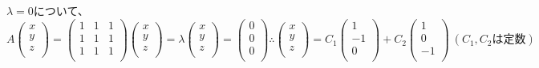 \documentclass[]{jsarticle}
\begin{document}
        $\lambda = 0$について、
            \begin{equation*}
                A
                \begin{pmatrix}
                    x \\
                    y \\
                    z \\
                \end{pmatrix} =
                \begin{pmatrix}
                    1 & 1 & 1 \\
                    1 & 1 & 1 \\
                    1 & 1 & 1 \\
                \end{pmatrix}
                \begin{pmatrix}
                    x \\
                    y \\
                    z \\
                \end{pmatrix} =
                \lambda
                \begin{pmatrix}
                    x \\
                    y \\
                    z \\
                \end{pmatrix} =
                \begin{pmatrix}
                    0 \\
                    0 \\
                    0 \\
                \end{pmatrix}
                \therefore
                \begin{pmatrix}
                    x \\
                    y \\
                    z \\
                \end{pmatrix} =
                C_1\begin{pmatrix}
                    1 \\
                    -1 \\
                    0 \\
                \end{pmatrix} +
                C_2\begin{pmatrix}
                    1 \\
                    0 \\
                    -1 \\
                \end{pmatrix} \
                (C_1, C_2は定数)
            \end{equation*}
        
\end{document}
